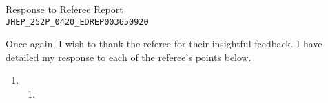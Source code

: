 \documentclass[11pt,letterpaper]{article}
\begin{document}
\vspace{.2in}
\begin{center}
    {\Large Response to Referee Report \\ \verb+JHEP_252P_0420_EDREP003650920+}  
\end{center}

\vspace{.25in}

Once again, I wish to thank the referee for their insightful feedback. I have detailed my response to each of the referee's points below.

\begin{enumerate}
    \item %
    \begin{enumerate}
        \item 
    \end{enumerate}   
\end{enumerate}
\end{document}
